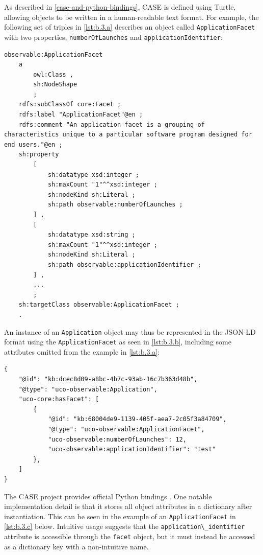 \documentclass[letterpaper,12pt]{report}
\newcommand{\passthrough}[1]{#1}
\begin{document}
As described in \autoref{case-and-python-bindings}, CASE is defined using Turtle, allowing objects to be
written in a human-readable text format. For example, the following set
of triples in \autoref{lst:b.3.a} describes an object called
\passthrough{\lstinline!ApplicationFacet!} with two properties,
\passthrough{\lstinline!numberOfLaunches!} and
\passthrough{\lstinline!applicationIdentifier!}:

\begin{lstlisting}[label={lst:b.3.a}, caption={Example CASE object definition for applications \cite{UcoProjectUCO2025}}, ]
observable:ApplicationFacet
    a
        owl:Class ,
        sh:NodeShape
        ;
    rdfs:subClassOf core:Facet ;
    rdfs:label "ApplicationFacet"@en ;
    rdfs:comment "An application facet is a grouping of characteristics unique to a particular software program designed for end users."@en ;
    sh:property
        [
            sh:datatype xsd:integer ;
            sh:maxCount "1"^^xsd:integer ;
            sh:nodeKind sh:Literal ;
            sh:path observable:numberOfLaunches ;
        ] ,
        [
            sh:datatype xsd:string ;
            sh:maxCount "1"^^xsd:integer ;
            sh:nodeKind sh:Literal ;
            sh:path observable:applicationIdentifier ;
        ] ,
        ...
        ;
    sh:targetClass observable:ApplicationFacet ;
    .
\end{lstlisting}

An instance of an \passthrough{\lstinline!Application!} object may thus
be represented in the JSON-LD format using the
\passthrough{\lstinline!ApplicationFacet!} as seen in
\autoref{lst:b.3.b}, including some attributes omitted from the example
in \autoref{lst:b.3.a}:

\begin{lstlisting}[label={lst:b.3.b}, caption={Instantiated CASE application object as JSON-LD }, ]
{
    "@id": "kb:dcec8d09-a8bc-4b7c-93ab-16c7b363d48b",
    "@type": "uco-observable:Application",
    "uco-core:hasFacet": [
        {
            "@id": "kb:68004de9-1139-405f-aea7-2c05f3a84709",
            "@type": "uco-observable:ApplicationFacet",
            "uco-observable:numberOfLaunches": 12,
            "uco-observable:applicationIdentifier": "test"
        },
    ]
}
\end{lstlisting}

The CASE project provides official Python bindings
\cite{CaseworkCASEMappingPython}. One notable implementation detail
is that it stores all object attributes in a dictionary after
instantiation. This can be seen in the example of an
\passthrough{\lstinline!ApplicationFacet!} in \autoref{lst:b.3.c} below.
Intuitive usage suggests that the
\passthrough{\lstinline!application\_identifier!} attribute is
accessible through the \passthrough{\lstinline!facet!} object, but it
must instead be accessed as a dictionary key with a non-intuitive name.
\end{document}
